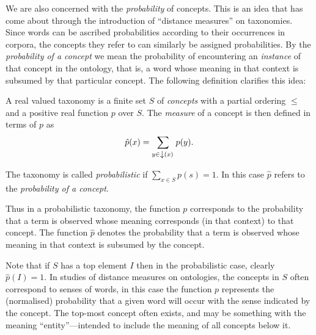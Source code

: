 \documentclass{report}
\begin{document}
We are also concerned with the \emph{probability} of concepts. This is an idea that has come about through the introduction of ``distance measures'' on taxonomies. Since words can be ascribed probabilities according to their occurrences in corpora, the concepts they refer to can similarly be assigned probabilities. By the \emph{probability of a concept} we mean the probability of encountering an \emph{instance} of that concept in the ontology, that is, a word whose meaning in that context is subsumed by that particular concept. The following definition clarifies this idea:
\begin{defn}
A real valued taxonomy is a finite set $S$ of \emph{concepts} with a partial ordering $\le$ and a positive real function $p$ over $S$. The \emph{measure} of a concept is then defined in terms of $p$ as
$$\hat{p}(x) = \sum_{y \in \left\downarrow(x)\right.} p(y).$$

The taxonomy is called \emph{probabilistic} if $\sum_{x \in S} p(s) = 1$. In this case $\hat{p}$ refers to the \emph{probability of a concept}.
\end{defn}
Thus in a probabilistic taxonomy, the function $p$ corresponds to the probability that a term is observed whose meaning corresponds (in that context) to that concept. The function $\hat{p}$ denotes the probability that a term is observed whose meaning in that context is subsumed by the concept.

Note that if $S$ has a top element $I$ then in the probabilistic case, clearly $\hat{p}(I) = 1$. In studies of distance measures on ontologies, the concepts in $S$ often correspond to senses of words, in this case the function $p$ represents the (normalised) probability that a given word will occur with the sense indicated by the concept. The top-most concept often exists, and may be something with the meaning ``entity''---intended to include the meaning of all concepts below it.
\end{document}
